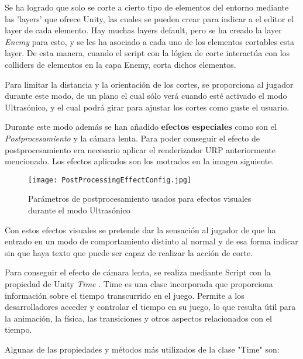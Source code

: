 Se ha logrado que solo se corte a cierto tipo de elementos del entorno mediante las 'layers' que ofrece Unity, las cuales se pueden crear para indicar a el editor el layer de cada elemento. Hay muchas layers default, pero se ha creado la layer \textit{Enemy} para esto, y se les ha asociado a cada uno de los elementos cortables esta layer. De esta manera, cuando el script con la lógica de corte interactúa con los colliders de elementos en la capa Enemy, corta dichos elementos.

Para limitar la distancia y la orientación de los cortes, se proporciona al jugador durante este modo, de un plano el cual sólo verá cuando esté activado el modo Ultrasónico, y el cual podrá girar para ajustar los cortes como guste el usuario. 

Durante este modo además se han añadido \textbf{efectos especiales} como son el \textit{Postprocesamiento} y la cámara lenta. Para poder conseguir el efecto de postprocesamiento era necesario aplicar el renderizador URP anteriormente mencionado. Los efectos aplicados son los motrados en la imagen siguiente.

\begin{figure}[H]
    \centering
    \texttt{[image: PostProcessingEffectConfig.jpg]}
    \caption{Parámetros de postprocesamiento usados para efectos visuales durante el modo Ultrasónico}
\end{figure}

Con estos efectos visuales se pretende dar la sensación al jugador de que ha entrado en un modo de comportamiento distinto al normal y de esa forma indicar sin que haya texto que puede ser capaz de realizar la acción de corte.

Para conseguir el efecto de cámara lenta, se realiza mediante Script con la propiedad de Unity \textit{Time} \cite{Time}. Time es una clase incorporada que proporciona información sobre el tiempo transcurrido en el juego. Permite a los desarrolladores acceder y controlar el tiempo en su juego, lo que resulta útil para la animación, la física, las transiciones y otros aspectos relacionados con el tiempo.

Algunas de las propiedades y métodos más utilizados de la clase "Time" son:
 
